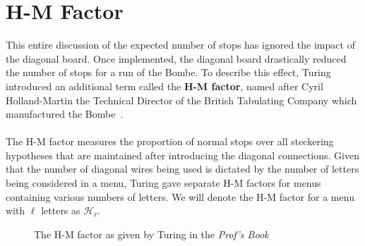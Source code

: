 \section{H-M Factor}
This entire discussion of the expected number of stops has ignored
the impact of the diagonal board. Once implemented, the diagonal
board drastically reduced the number of stops for a run of the Bombe.
To describe this effect, Turing introduced an additional term called
the {\bf{H-M factor}}, named after Cyril Holland-Martin the Technical
Director of the British Tabulating Company which manufactured the Bombe~\cite[p.~116]{Turing1940ProfBook}.
\\\\The H-M factor measures the proportion of normal stops over all
steckering hypotheses that are maintained after introducing the
diagonal connections. Given that the number of diagonal wires being
used is dictated by the number of letters being considered in a menu,
Turing gave separate H-M factors for menus containing various numbers
of letters. We will denote the H-M factor for a menu with $\ell$ letters
as $\mathcal{H}_\ell$.
\begin{figure}[H]
\centering
{}
\caption{The H-M factor as given by Turing in the \emph{Prof's Book}~\cite[p.~116]{Turing1940ProfBook}}
\end{figure}
